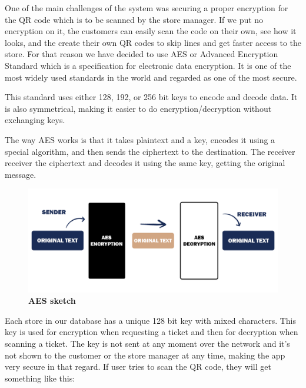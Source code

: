 One of the main challenges of the system was securing a proper encryption for the QR code which is to be scanned by the store manager. If we put no encryption on it, the customers can easily scan the code on their own, see how it looks, and the create their own QR codes to skip lines and get faster access to the store. \newline
For that reason we have decided to use AES or Advanced Encryption Standard which is a specification for electronic data encryption. It is one of the most widely used standards in the world and regarded as one of the most secure. \newline

This standard uses either 128, 192, or 256 bit keys to encode and decode data. It is also symmetrical, making it easier to do encryption/decryption without exchanging keys. \newline

The way AES works is that it takes plaintext and a key, encodes it using a special algorithm, and then sends the ciphertext to the destination. The receiver receiver the ciphertext and decodes it using the same key, getting the original message. \newline

\begin{figure}[H]
\centering
\includegraphics[width=\textwidth]{Images/AES}
\caption{\label{fig:aes}\textbf{AES sketch}}
\end{figure}

Each store in our database has a unique 128 bit key with mixed characters. This key is used for encryption when requesting a ticket and then for decryption when scanning a ticket. The key is not sent at any moment over the network and it's not shown to the customer or the store manager at any time, making the app very secure in that regard.\newline
If user tries to scan the QR code, they will get something like this:\newline

